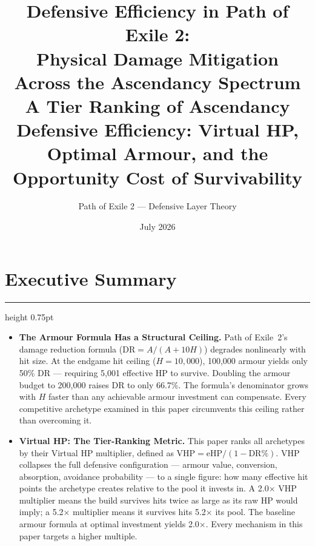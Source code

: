 \documentclass[12pt, letterpaper]{article}
\title{
    \vspace{1.8in}
    {\Large\bfseries Defensive Efficiency in Path of Exile 2:\\[0.2em]
    Physical Damage Mitigation\\[0.2em]
    Across the Ascendancy Spectrum} \\[0.4em]
    {\normalsize A Tier Ranking of Ascendancy Defensive Efficiency: Virtual HP, Optimal Armour, and the Opportunity Cost of Survivability}
}
\author{Path of Exile 2 --- Defensive Layer Theory}
\date{\small July 2026}
\begin{document}
\maketitle
\thispagestyle{empty}
\newpage
\setcounter{page}{1}

\tableofcontents
\newpage

\section*{Executive Summary}
\hrule height 0.75pt
\vspace{6pt}

\begin{itemize}
    \item \textbf{The Armour Formula Has a Structural Ceiling.} Path of Exile~2's damage reduction formula ($\text{DR} = A / (A + 10H)$) degrades nonlinearly with hit size. At the endgame hit ceiling ($H = 10{,}000$), 100{,}000 armour yields only 50\% DR --- requiring 5{,}001 effective HP to survive. Doubling the armour budget to 200{,}000 raises DR to only 66.7\%. The formula's denominator grows with $H$ faster than any achievable armour investment can compensate. Every competitive archetype examined in this paper circumvents this ceiling rather than overcoming it.

    \item \textbf{Virtual HP: The Tier-Ranking Metric.} This paper ranks all archetypes by their Virtual HP multiplier, defined as $\text{VHP} = \text{eHP} / (1 - \text{DR\%})$. VHP collapses the full defensive configuration --- armour value, conversion, absorption, avoidance probability --- to a single figure: how many effective hit points the archetype creates relative to the pool it invests in. A 2.0$\times$ VHP multiplier means the build survives hits twice as large as its raw HP would imply; a 5.2$\times$ multiplier means it survives hits 5.2$\times$ its pool. The baseline armour formula at optimal investment yields 2.0$\times$. Every mechanism in this paper targets a higher multiple.


\end{itemize}
\end{document}
